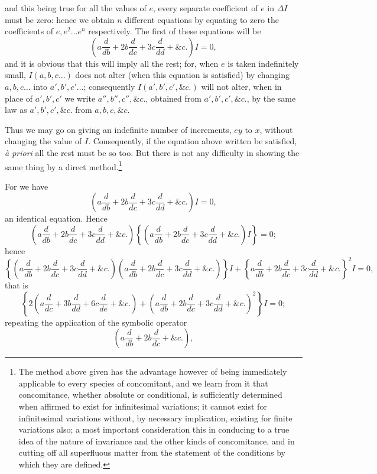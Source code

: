 \documentclass[11pt]{article}
\newcommand{\sourcepage}[1]{\marginpar{\scriptsize p.~#1}}
\begin{document}
\sourcepage{353}
and this being true for all the values of $e$, every separate coefficient of $e$ in $\Delta I$ must be zero: hence we obtain $n$ different equations by equating to zero the coefficients of $e,e^2\ldots e^n$ respectively. The first of these equations will be
\[
\left(a\frac{d}{db}+2b\frac{d}{dc}+3c\frac{d}{dd}+\&c.\right)I=0,
\]
and it is obvious that this will imply all the rest; for, when $e$ is taken indefinitely small, $I(a,b,c\ldots)$ does not alter (when this equation is satisfied) by changing $a,b,c\ldots$ into $a',b',c'\ldots$; consequently $I(a',b',c',\&c.)$ will not alter, when in place of $a',b',c'$ we write $a'',b'',c'',\&c.$, obtained from $a',b',c',\&c.$, by the same law as $a',b',c',\&c.$ from $a,b,c,\&c.$

Thus we may go on giving an indefinite number of increments, $ey$ to $x$, without changing the value of $I$. Consequently, if the equation above written be satisfied, \emph{à priori} all the rest must be so too. But there is not any difficulty in showing the same thing by a direct method.\footnote{The method above given has the advantage however of being immediately applicable to every species of concomitant, and we learn from it that concomitance, whether absolute or conditional, is sufficiently determined when affirmed to exist for infinitesimal variations; it cannot exist for infinitesimal variations without, by necessary implication, existing for finite variations also; a most important consideration this in conducing to a true idea of the nature of invariance and the other kinds of concomitance, and in cutting off all superfluous matter from the statement of the conditions by which they are defined.}

For we have
\[
\left(a\frac{d}{db}+2b\frac{d}{dc}+3c\frac{d}{dd}+\&c.\right)I=0,
\]
an identical equation. Hence
\[
\left(a\frac{d}{db}+2b\frac{d}{dc}+3c\frac{d}{dd}+\&c.\right)
\left\{\left(a\frac{d}{db}+2b\frac{d}{dc}+3c\frac{d}{dd}+\&c.\right)I\right\}=0;
\]
hence
\[
\left\{\left(a\frac{d}{db}+2b\frac{d}{dc}+3c\frac{d}{dd}+\&c.\right)
\left(a\frac{d}{db}+2b\frac{d}{dc}+3c\frac{d}{dd}+\&c.\right)\right\}I
+\left\{a\frac{d}{db}+2b\frac{d}{dc}+3c\frac{d}{dd}+\&c.\right\}^2I=0,
\]
that is
\[
\left\{2\left(a\frac{d}{dc}+3b\frac{d}{dd}+6c\frac{d}{de}+\&c.\right)
+\left(a\frac{d}{db}+2b\frac{d}{dc}+3c\frac{d}{dd}+\&c.\right)^2\right\}I=0;
\]
repeating the application of the symbolic operator
\[
\left(a\frac{d}{db}+2b\frac{d}{dc}+\&c.\right),
\]
\end{document}
